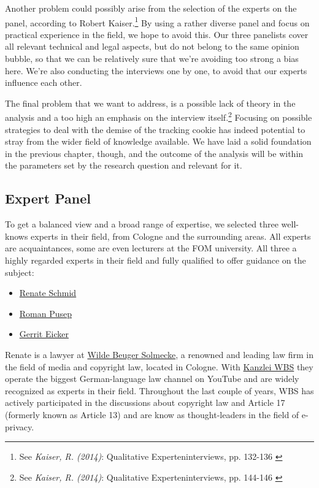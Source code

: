Another problem could possibly arise from the selection of the experts on the panel, according to Robert Kaiser.\footnote{See \textit{Kaiser, R. (2014)}: Qualitative Experteninterviews, pp. 132-136 \cite{expertInterviews}} By using a rather diverse panel and focus on practical experience in the field, we hope to avoid this. Our three panelists cover all relevant technical and legal aspects, but do not belong to the same opinion bubble, so that we can be relatively sure that we're avoiding too strong a bias here. We're also conducting the interviews one by one, to avoid that our experts influence each other.

The final problem that we want to address, is a possible lack of theory in the analysis and a too high an emphasis on the interview itself.\footnote{See \textit{Kaiser, R. (2014)}: Qualitative Experteninterviews, pp. 144-146 \cite{expertInterviews}} Focusing on possible strategies to deal with the demise of the tracking cookie has indeed potential to stray from the wider field of knowledge available. We have laid a solid foundation in the previous chapter, though, and the outcome of the analysis will be within the parameters set by the research question and relevant for it.

\subsection{Expert Panel}

To get a balanced view and a broad range of expertise, we selected three well-knows experts in their field, from Cologne and the surrounding areas. All experts are acquaintances, some are even lecturers at the FOM university. All three a highly regarded experts in their field and fully qualified to offer guidance on the subject:

\begin{itemize}
 \item \href{https://www.linkedin.com/in/renate-schmid-535233113/}{Renate Schmid}
 \item \href{https://www.linkedin.com/in/roman-pusep-36b33374/}{Roman Pusep}
 \item \href{https://www.linkedin.com/in/eicker/}{Gerrit Eicker}
\end{itemize}

Renate is a lawyer at \href{https://www.wbs-law.de/}{Wilde Beuger Solmecke}, a renowned and leading law firm in the field of media and copyright law, located in Cologne. With \href{https://www.youtube.com/user/KanzleiWBS}{Kanzlei WBS} they operate the biggest German-language law channel on YouTube and are widely recognized as experts in their field. Throughout the last couple of years, WBS has actively participated in the discussions about copyright law and Article 17 (formerly known as Article 13) and are know as thought-leaders in the field of e-privacy.


